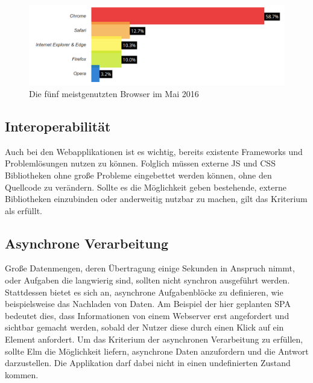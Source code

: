 \begin{figure}[hb]
  \centering  
  \includegraphics[scale=0.3]{img/browser_2016.png}
  \caption{Die fünf meistgenutzten Browser im Mai 2016 \cite{top-five-browser-statistics}}\label{fig:browser-may-2016}
\end{figure}

\subsection{Interoperabilität}
\label{sec:muster_interoperabilitaet}
Auch bei den Webapplikationen ist es wichtig, bereits existente Frameworks und Problemlösungen nutzen zu können. Folglich müssen externe \ac{JS} und \ac{CSS} Bibliotheken ohne große Probleme eingebettet werden können, ohne den Quellcode zu verändern. Sollte es die Möglichkeit geben bestehende, externe Bibliotheken einzubinden oder anderweitig nutzbar zu machen, gilt das Kriterium als erfüllt.


\subsection{Asynchrone Verarbeitung}
\label{sec:muster_asynchrone_verarbeitung}
Große Datenmengen, deren Übertragung einige Sekunden in Anspruch nimmt, oder Aufgaben die langwierig sind, sollten nicht synchron ausgeführt werden. Stattdessen bietet es sich an, asynchrone Aufgabenblöcke zu definieren, wie beispielsweise das Nachladen von Daten. Am Beispiel der hier geplanten \ac{SPA} bedeutet dies, dass Informationen von einem Webserver erst angefordert und sichtbar gemacht werden, sobald der Nutzer diese durch einen Klick auf ein Element anfordert. Um das Kriterium der asynchronen Verarbeitung zu erfüllen, sollte Elm die Möglichkeit liefern, asynchrone Daten anzufordern und die Antwort darzustellen. Die Applikation darf dabei nicht in einen undefinierten Zustand kommen.


